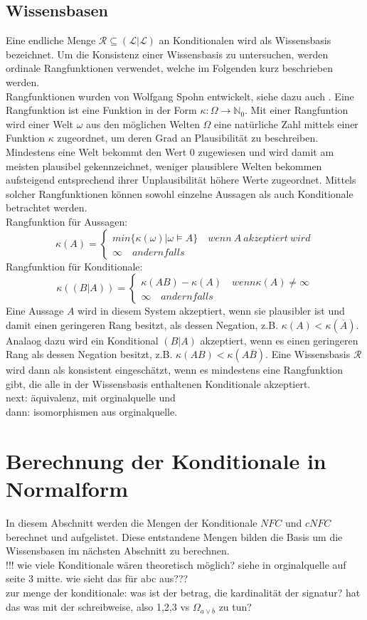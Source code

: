 \documentclass[12pt,a4paper]{article}
\newcommand{\lag}{\mathcal{L}}
\begin{document}
\subsection{Wissensbasen}
Eine endliche Menge $\mathcal{R} \subseteq (\lag | \lag)$ an Konditionalen wird als Wissensbasis bezeichnet. Um die Konsistenz einer Wissensbasis zu untersuchen, werden ordinale Rangfunktionen verwendet, welche im Folgenden kurz beschrieben werden. \\
Rangfunktionen wurden von Wolfgang Spohn entwickelt, siehe dazu auch \cite{spohn88}. Eine Rangfunktion ist eine Funktion in der Form $\kappa :  \Omega \rightarrow \mathbb{N}_0 $. Mit einer Rangfuntion wird einer Welt $\omega$ aus den möglichen Welten $\Omega$ eine natürliche Zahl mittels einer Funktion $\kappa$ zugeordnet, um deren Grad an Plausibilität zu beschreiben. Mindestens eine Welt bekommt den Wert 0 zugewiesen und wird damit am meisten plausibel gekennzeichnet, weniger plausiblere Welten bekommen aufsteigend entsprechend ihrer Unplausibilität höhere Werte zugeordnet. Mittels solcher Rangfunktionen können sowohl einzelne Aussagen als auch Konditionale betrachtet werden.\\
Rangfunktion für Aussagen:
\[
 \kappa(A)=\begin{cases}
			min\{\kappa(\omega)|\omega \models A \} \quad wenn \  A \ akzeptiert \ wird \\
			\infty \quad andernfalls
            \end{cases}
\]
Rangfunktion für Konditionale:
\[
\kappa((B|A))=\begin{cases}
			\kappa(AB) - \kappa(A) \quad wenn \kappa(A) \neq \infty \\
			\infty \quad andernfalls
            \end{cases}
\]
Eine Aussage $A$ wird in diesem System akzeptiert, wenn sie plausibler ist und damit einen geringeren Rang besitzt, als dessen Negation, z.B. $\kappa(A) < \kappa(\overline{A})$.  Analaog dazu wird ein Konditional $(B|A)$ akzeptiert, wenn es einen geringeren Rang als dessen Negation besitzt, z.B. $\kappa(AB)<\kappa(A\overline{B})$. Eine Wissensbasis $\mathcal{R}$ wird dann als konsistent eingeschätzt, wenn es mindestens eine Rangfunktion gibt, die alle in der Wissensbasis enthaltenen Konditionale akzeptiert.\\
next: äquivalenz, mit orginalquelle und \cite{beierle17b} \\
dann: isomorphismen aus orginalquelle.
\section{Berechnung der Konditionale in Normalform}
In diesem Abschnitt werden die Mengen der Konditionale $NFC$ und $cNFC$ berechnet und aufgelistet. Diese entstandene Mengen bilden die Basis um die Wissensbasen im nächsten Abschnitt zu berechnen. \\
!!! wie viele Konditionale wären theoretisch möglich?  siehe in orginalquelle auf seite 3 mitte. wie sieht das für abc aus???\\
zur menge der konditionale: was ist der betrag, die kardinalität der signatur? hat das was mit der schreibweise, also {1,2,3} vs $\Omega_{a \vee \overline{b}}$ zu tun?
\end{document}
